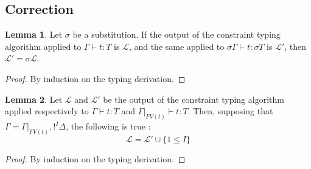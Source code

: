 \documentclass[10pt]{article}
\theoremstyle{plain}
\theoremstyle{definition}
\newtheorem{lemma}{Lemma}[section]
\begin{document}
\subsection{Correction}

\begin{lemma}
	\label{tau-context}
	Let $\sigma$ be a substitution. If the output of the constraint typing algorithm applied to $\Gamma \vdash t : T$ is $\mathcal{L}$,
	and the same applied to $\sigma \Gamma \vdash t : \sigma T$ is $\mathcal{L'}$,
	then $\mathcal{L'} = \sigma \mathcal{L}$.
	
	\begin{proof}
		By induction on the typing derivation.
	\end{proof}
\end{lemma}

\begin{lemma}
	\label{red-context}
	Let $\mathcal{L}$ and $\mathcal{L'}$ be the output of the constraint typing algorithm applied respectively to
	$\Gamma \vdash t : T$ and $\Gamma |_{FV(t)} \vdash t : T$. Then, supposing that $\Gamma = \Gamma |_{FV(t)}, !^I \Delta$,
	the following is true :
		$$ \mathcal{L} = \mathcal{L'} \cup \{ 1 \le I \} $$
		
	\begin{proof}
		By induction on the typing derivation.
	\end{proof}
\end{lemma}
\end{document}
